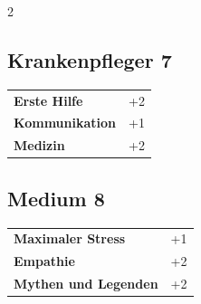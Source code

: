 \begin{multicols}{2}
\begin{tcolorbox}

\end{tcolorbox}

\begin{tcolorbox}
    \subsection*{Krankenpfleger \hfill \small{7 }}
    \tcblower




\begin{tabular}{@{}ll@{}}
    \textbf{Erste Hilfe} & +2\\
    \textbf{Kommunikation} & +1\\
    \textbf{Medizin} & +2\\
\end{tabular}


\end{tcolorbox}

\begin{tcolorbox}
    \subsection*{Medium \hfill \small{8 }}
    \tcblower




\begin{tabular}{@{}ll@{}}
    \textbf{Maximaler Stress} & +1\\
    \textbf{Empathie} & +2\\
    \textbf{Mythen und Legenden} & +2\\
\end{tabular}


\end{tcolorbox}


\end{multicols}
